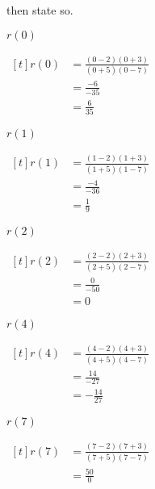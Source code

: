 \begin{exercises}
\begin{problem}
then state so.
\begin{multicols}{4}
    \begin{subproblem}
   $r(0)$ 
        \begin{shortsolution}
         $\begin{aligned}[t]
          r(0)&=\frac{(0-2)(0+3)}{(0+5)(0-7)}\\
          &=\frac{-6}{-35}\\
          &=\frac{6}{35}
         \end{aligned}$
        \end{shortsolution}
    \end{subproblem}
    \begin{subproblem}
    $r(1)$ 
        \begin{shortsolution}
         $\begin{aligned}[t]
          r(1)&=\frac{(1-2)(1+3)}{(1+5)(1-7)}\\
          &=\frac{-4}{-36}\\
          &=\frac{1}{9}
         \end{aligned}$
        \end{shortsolution}
    \end{subproblem}
    \begin{subproblem}
   $r(2)$ 
        \begin{shortsolution}
         $\begin{aligned}[t]
          r(2)&=\frac{(2-2)(2+3)}{(2+5)(2-7)}\\
          & = \frac{0}{-50}\\
          &=0
         \end{aligned}$
        \end{shortsolution}
    \end{subproblem}
    \begin{subproblem}
   $r(4)$ 
        \begin{shortsolution}
         $\begin{aligned}[t]
          r(4)&=\frac{(4-2)(4+3)}{(4+5)(4-7)}\\
          &=\frac{14}{-27}\\
          &=-\frac{14}{27}
         \end{aligned}$
        \end{shortsolution}
    \end{subproblem}
    \begin{subproblem}
   $r(7)$ 
        \begin{shortsolution}
         $\begin{aligned}[t]
          r(7)&=\frac{(7-2)(7+3)}{(7+5)(7-7)}\\
          & =\frac{50}{0}
         \end{aligned}$
         

\end{shortsolution}
\end{subproblem}
\end{multicols}
\end{problem}
\end{exercises}
